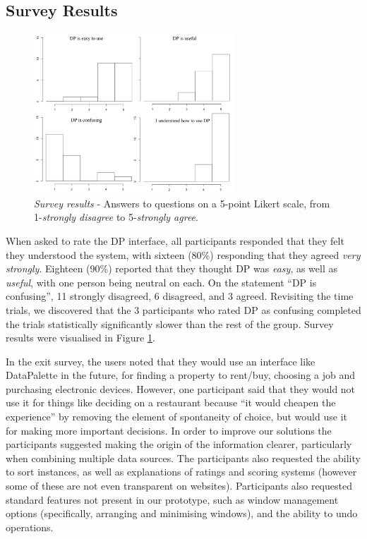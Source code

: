 \documentclass{sigchi}
\begin{document}
\subsection{Survey Results}

\begin{figure}[tbp]
\begin{center}
\includegraphics[width=7.5cm]{img/survey}
\caption{\emph{Survey results} - Answers to questions on a 5-point Likert scale, from 1-\emph{strongly disagree} to 5-\emph{strongly agree}.}
\label{fig:survey}
\end{center}
\end{figure}

When asked to rate the DP interface, all participants responded that they felt they understood the system, with sixteen (80\%) responding that they agreed \emph{very strongly}.  Eighteen (90\%) reported that they thought  DP was \emph{easy}, as well as \emph{useful}, with one person being neutral on each.  On the statement ``DP is confusing'',  11 strongly disagreed, 6 disagreed, and 3 agreed.  Revisiting the time trials, we discovered that the 3 participants who rated DP as confusing completed the trials statistically significantly slower than the rest of the group. Survey results were visualised in Figure \ref{fig:survey}.


In the exit survey, the users noted that they would use an interface like DataPalette in the future, for finding a property to rent/buy, choosing a job and purchasing electronic devices.  However, one participant said that they would not use it for things like deciding on a restaurant because ``it would cheapen the experience'' by removing the element of spontaneity of choice, but would use it for making more important decisions.  In order to improve our solutions the participants suggested making the origin of the information clearer, particularly when combining multiple data sources. The participants also requested the ability to sort instances, as well as explanations of ratings and scoring systems (however some of these are not even transparent on websites). Participants also requested standard features not present in our prototype, such as window management options (specifically, arranging and minimising windows), and the ability to undo operations.
\end{document}
